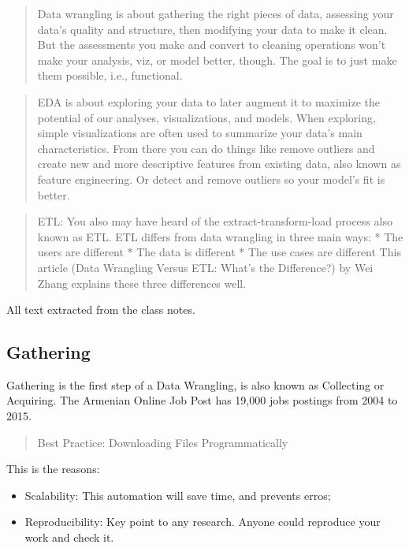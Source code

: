 \documentclass[]{book}
\providecommand{\tightlist}{%
  \setlength{\itemsep}{0pt}\setlength{\parskip}{0pt}}
\begin{document}
\begin{quote}
Data wrangling is about gathering the right pieces of data, assessing
your data's quality and structure, then modifying your data to make it
clean. But the assessments you make and convert to cleaning operations
won't make your analysis, viz, or model better, though. The goal is to
just make them possible, i.e., functional.
\end{quote}

\begin{quote}
EDA is about exploring your data to later augment it to maximize the
potential of our analyses, visualizations, and models. When exploring,
simple visualizations are often used to summarize your data's main
characteristics. From there you can do things like remove outliers and
create new and more descriptive features from existing data, also known
as feature engineering. Or detect and remove outliers so your model's
fit is better.
\end{quote}

\begin{quote}
ETL: You also may have heard of the extract-transform-load process also
known as ETL. ETL differs from data wrangling in three main ways: * The
users are different * The data is different * The use cases are
different This article (Data Wrangling Versus ETL: What's the
Difference?) by Wei Zhang explains these three differences well.
\end{quote}

All text extracted from the class notes.

\subsection{Gathering}\label{gathering}

Gathering is the first step of a Data Wrangling, is also known as
Collecting or Acquiring. The Armenian Online Job Post has 19,000 jobs
postings from 2004 to 2015.

\begin{quote}
Best Practice: Downloading Files Programmatically
\end{quote}

This is the reasons:

\begin{itemize}
\tightlist
\item
  Scalability: This automation will save time, and prevents erros;
\item
  Reproducibility: Key point to any research. Anyone could reproduce
  your work and check it.
\end{itemize}
\end{document}
